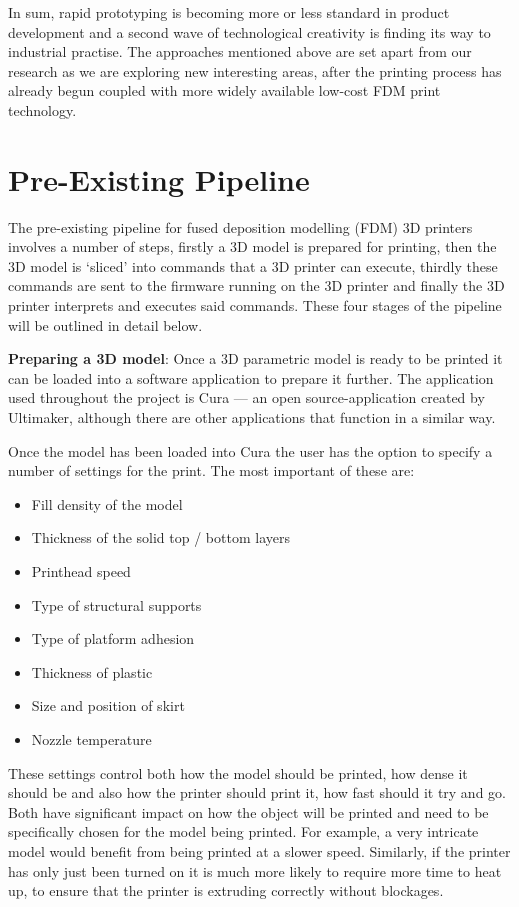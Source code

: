 \documentclass[11pt]{report} %
\begin{document}
In sum, rapid prototyping is becoming more or less standard in product development and a second wave of technological creativity is finding its way to industrial practise. The approaches mentioned above are set apart from our research as we are exploring new interesting areas, after the printing process has already begun coupled with more widely available low-cost FDM print technology. 




\section{Pre-Existing Pipeline}
\label{section:PreExistingPipeline}
The pre-existing pipeline for fused deposition modelling (FDM) 3D printers involves a number of steps, firstly a 3D model is prepared for printing, then the 3D model is `sliced' into commands that a 3D printer can execute, thirdly these commands are sent to the firmware running on the 3D printer and finally the 3D printer interprets and executes said commands. These four stages of the pipeline will be outlined in detail below. 

\textbf{Preparing a 3D model}: Once a 3D parametric model is ready to be printed it can be loaded into a software application to prepare it further. The application used throughout the project is Cura --- an open source-application created by Ultimaker, although there are other applications that function in a similar way.

Once the model has been loaded into Cura the user has the option to specify a number of settings for the print. The most important of these are:

\begin{itemize}
\item Fill density of the model
\item Thickness of the solid top / bottom layers
\item Printhead speed
\item Type of structural supports
\item Type of platform adhesion
\item Thickness of plastic
\item Size and position of skirt
\item Nozzle temperature
\end{itemize}

These settings control both how the model should be printed, how dense it should be and also how the printer should print it, how fast should it try and go. Both have significant impact on how the object will be printed and need to be specifically chosen for the model being printed. For example, a very intricate model would benefit from being printed at a slower speed. Similarly, if the printer has only just been turned on it is much more likely to require more time to heat up, to ensure that the printer is extruding correctly without blockages.
\end{document}
